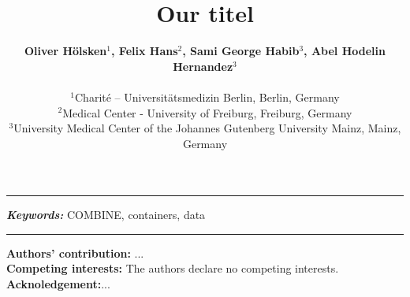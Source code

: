 \documentclass[a4paper, 12pt]{article}
\title{Our titel}
\date{} %
\providecommand{\keywords}[1]
{
  \small	
  \textbf{\textit{Keywords: }} #1
}
\begin{document}
\maketitle

  \noindent\author{\textbf{Oliver H\"olsken$^{1}$, Felix Hans$^{2}$, Sami George Habib$^{3}$, Abel Hodelin Hernandez$^{3}$} \\ \\
	\small $^{1}$Charité – Universitätsmedizin Berlin, Berlin, Germany \\
	\small $^{2}$Medical Center - University of Freiburg, Freiburg, Germany \\
	\small $^{3}$University Medical Center of the Johannes Gutenberg University Mainz, Mainz, Germany \\
}
\hrule

 \hspace{10pt}

\keywords{COMBINE, containers, data}

\hrule









\noindent\small \textbf{Authors' contribution:} ... \\ 
\noindent\small \textbf{Competing interests:} The authors declare no competing interests.\\
\noindent\small \textbf{Acknoledgement:}...

\nocite{*}           %
\printbibliography 
\end{document}
